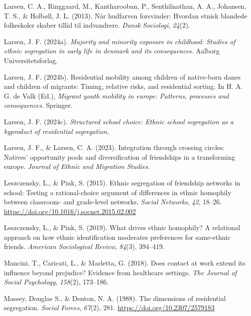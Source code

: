 \documentclass[
]{book}
\newlength{\cslhangindent}
\newenvironment{CSLReferences}[2] %
 {\begin{list}{}{%
  \setlength{\itemindent}{0pt}
  \setlength{\leftmargin}{0pt}
  \setlength{\parsep}{0pt}
  \ifodd #1
   \setlength{\leftmargin}{\cslhangindent}
   \setlength{\itemindent}{-1\cslhangindent}
  \fi
  \setlength{\itemsep}{#2\baselineskip}}}
 {\end{list}}
\begin{document}
\begin{CSLReferences}{1}{0}
Larsen, C. A., Ringgaard, M., Kantharooban, P., Senthilnathan, A. A., Johansen, T. S., \& Holbøll, J. L. (2013). Når hudfarven forsvinder: Hvordan etnisk blandede folkeskoler skaber tillid til indvandrere. \emph{Dansk Sociologi}, \emph{24}(2).

Larsen, J. F. (2024a). \emph{Majority and minority exposure in childhood: Studies of ethnic segregation in early life in denmark and its consequences}. Aalborg Universitetsforlag.

Larsen, J. F. (2024b). Residential mobility among children of native-born danes and children of migrants: Timing, relative risks, and residential sorting. In H. A. G. de Valk (Ed.), \emph{Migrant youth mobility in europe: Patterns, processes and consequences}. Springer.

Larsen, J. F. (2024c). \emph{Structured school choice: Ethnic school segregation as a byproduct of residential segregation}.

Larsen, J. F., \& Larsen, C. A. (2023). Integration through crossing circles: Natives' opportunity pools and diversification of friendships in a transforming europe. \emph{Journal of Ethnic and Migration Studies}.

Leszczensky, L., \& Pink, S. (2015). Ethnic segregation of friendship networks in school: Testing a rational-choice argument of differences in ethnic homophily between classroom- and grade-level networks. \emph{Social Networks}, \emph{42}, 18--26. \url{https://doi.org/10.1016/j.socnet.2015.02.002}

Leszczensky, L., \& Pink, S. (2019). What drives ethnic homophily? A relational approach on how ethnic identification moderates preferences for same-ethnic friends. \emph{American Sociological Review}, \emph{84}(3), 394--419.

Mancini, T., Caricati, L., \& Marletta, G. (2018). Does contact at work extend its influence beyond prejudice? Evidence from healthcare settings. \emph{The Journal of Social Psychology}, \emph{158}(2), 173--186.

Massey, Douglas S., \& Denton, N. A. (1988). The dimensions of residential segregation. \emph{Social Forces}, \emph{67}(2), 281. \url{https://doi.org/10.2307/2579183}


\end{CSLReferences}
\end{document}
